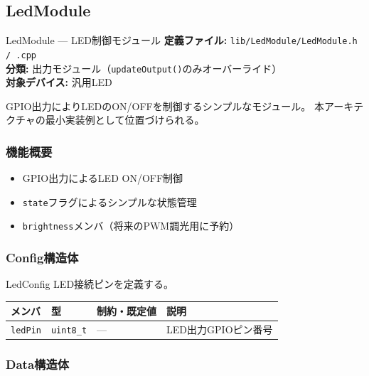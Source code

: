 \subsection{LedModule}

\begin{apibox}{LedModule --- LED制御モジュール}
\textbf{定義ファイル:} \texttt{lib/LedModule/LedModule.h / .cpp}\\
\textbf{分類:} 出力モジュール（\texttt{updateOutput()}のみオーバーライド）\\
\textbf{対象デバイス:} 汎用LED

GPIO出力によりLEDのON/OFFを制御するシンプルなモジュール。
本アーキテクチャの最小実装例として位置づけられる。
\end{apibox}

\subsubsection{機能概要}

\begin{itemize}
    \item GPIO出力によるLED ON/OFF制御
    \item \texttt{state}フラグによるシンプルな状態管理
    \item \texttt{brightness}メンバ（将来のPWM調光用に予約）
\end{itemize}

\subsubsection{Config構造体}

\begin{funcblock}{LedConfig}
LED接続ピンを定義する。

\begin{longtable}{l l l p{5.5cm}}
\toprule
\textbf{メンバ} & \textbf{型} & \textbf{制約・既定値} & \textbf{説明} \\
\midrule
\endhead
\texttt{ledPin} & \texttt{uint8\_t} & --- & LED出力GPIOピン番号 \\
\bottomrule
\end{longtable}
\end{funcblock}

\subsubsection{Data構造体}


